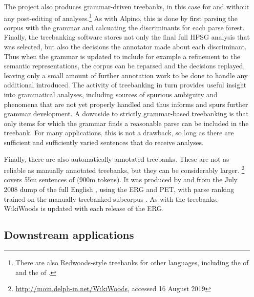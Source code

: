 \documentclass[output=paper,nonflat]{langsci/langscibook}
\begin{document}
The  project \citep{OFTM2004a-u} also produces grammar-driven
treebanks, in this case for  and without any post-editing of
analyses.\footnote{There are also Redwoods-style treebanks for other
  languages, including the  of 
  \citep{bond:etal:2004} and the  of 
  \citep{marimon:2015}.}  As with Alpino, this is done by first
parsing the corpus with the grammar and calcuating the discriminants
for each parse forest.  Finally, the treebanking software stores not
only the final full HPSG analysis that was selected, but also the
decisions the annotator made about each discriminant. Thus when the
grammar is updated to include for example a refinement to the semantic
representations, the corpus can be reparsed and the decisions
replayed, leaving only a small amount of further annotation work to be
done to handle any additional  introduced. The activity of
treebanking in turn provides useful insight into grammatical analyses,
including sources of spurious ambiguity and phenomena that are not yet
properly handled and thus informs and spurs further grammar
development.  A downside to strictly grammar-based treebanking is that
only items for which the grammar finds a reasonable parse can be
included in the treebank. For many applications, this is not a
drawback, so long as there are sufficient and sufficiently varied
sentences that do receive analyses.

Finally, there are also automatically annotated treebanks.
These are not as reliable as manually annotated treebanks,
but they can be considerably larger.
\footnote{\url{http://moin.delph-in.net/WikiWoods}, accessed 16 August 2019}
covers 55m sentences of  (900m tokens).
It was produced by \citet{flickinger2010wikiwoods} and \citet{solberg2012wikiwoods}
from the July 2008 dump of the full English ,
using the ERG and PET,
with parse ranking trained on the manually treebanked subcorpus  \citep{ytrestol2009wescience}.
As with the  treebanks, WikiWoods is updated with each release of the ERG.%
%
%
%
%
%



\subsection{Downstream applications}
\label{cl:downstream}
\end{document}
